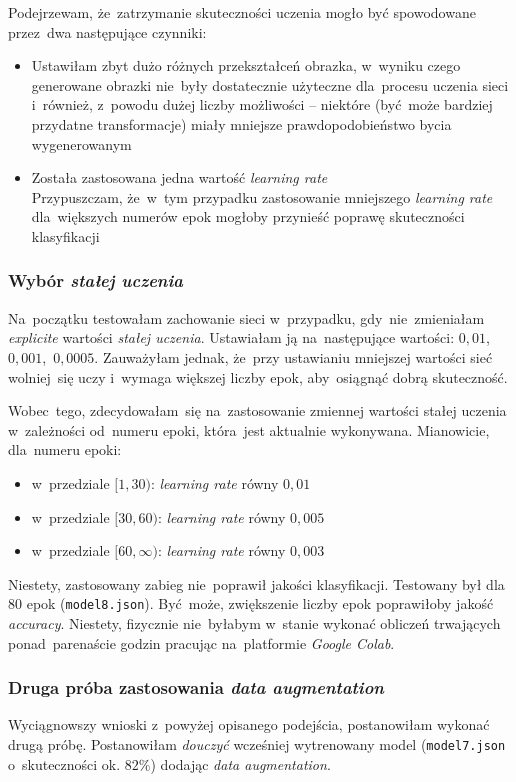 \documentclass[11pt, a4paper]{article}
\begin{document}
Podejrzewam, że~zatrzymanie skuteczności uczenia mogło być spowodowane przez~dwa następujące czynniki:
\begin{itemize}
    \item Ustawiłam zbyt dużo różnych przekształceń obrazka, w~wyniku czego generowane obrazki nie~były dostatecznie użyteczne dla~procesu uczenia sieci i~również, z~powodu dużej liczby możliwości -- niektóre (być~może bardziej przydatne transformacje) miały mniejsze prawdopodobieństwo bycia wygenerowanym
    \item Została zastosowana jedna wartość \textit{learning rate} \\
    Przypuszczam, że~w~tym przypadku zastosowanie mniejszego \textit{learning rate} dla~większych numerów epok mogłoby przynieść poprawę skuteczności klasyfikacji
\end{itemize}

\subsubsection{Wybór \textit{stałej uczenia}}
Na~początku testowałam zachowanie sieci w~przypadku, gdy~nie~zmieniałam \textit{explicite} wartości \textit{stałej uczenia}. Ustawiałam ją na~następujące wartości: $0,01$,\, $0,001$,\, $0,0005$. Zauważyłam jednak, że~przy ustawianiu mniejszej wartości sieć wolniej~się uczy i~wymaga większej liczby epok, aby~osiągnąć dobrą skuteczność.

Wobec~tego, zdecydowałam~się na~zastosowanie zmiennej wartości stałej uczenia w~zależności od~numeru epoki, która~jest aktualnie wykonywana. Mianowicie, dla~numeru epoki:
\begin{itemize}
    \item w~przedziale $[1, 30)$: \textit{learning rate} równy $0,01$
    \item w~przedziale $[30, 60)$: \textit{learning rate} równy $0,005$
    \item w~przedziale $[60, \infty)$: \textit{learning rate} równy $0,003$
\end{itemize}
Niestety, zastosowany zabieg nie~poprawił jakości klasyfikacji. Testowany był dla~$80$ epok (\texttt{model8.json}). Być~może, zwiększenie liczby epok poprawiłoby jakość \textit{accuracy}. Niestety, fizycznie nie~byłabym w~stanie wykonać obliczeń trwających ponad~parenaście godzin pracując na~platformie \textit{Google Colab}.

\subsubsection{Druga próba zastosowania \textit{data augmentation}}
Wyciągnowszy wnioski z~powyżej opisanego podejścia, postanowiłam wykonać drugą próbę.
Postanowiłam \textit{douczyć} wcześniej wytrenowany model (\texttt{model7.json} o~skuteczności ok. $82\%$) dodając \textit{data augmentation}.
\end{document}
